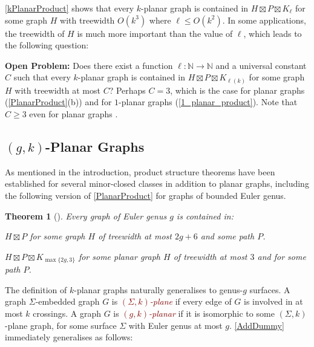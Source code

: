 \documentclass{patmorin}
\theoremstyle{plain}
\newtheorem{thm}{Theorem}
\theoremstyle{definition}
\newcommand{\defin}[1]{\textcolor{Maroon}{\emph{#1}}}
\renewcommand{\geq}{\geqslant}
\renewcommand{\leq}{\leqslant}
\newcommand{\N}{\mathbb{N}}
\begin{document}


\cref{kPlanarProduct} shows that every $k$-planar graph is contained in $H\boxtimes P \boxtimes K_\ell$ for some graph $H$ with treewidth $O(k^3)$ where $\ell\leq O(k^2)$.  In some applications, the treewidth of $H$ is much more important than the value of $\ell$, which leads to the following question:

\noindent\textbf{Open Problem:}
  Does there exist a function $\ell:\N\to\N$ and a universal constant $C$ such that every $k$-planar graph is contained in $H\boxtimes P \boxtimes K_{\ell(k)}$ for some graph $H$ with treewidth at most $C$?  Perhaps $C=3$, which is the case for planar graphs (\cref{PlanarProduct}(b)) and for $1$-planar graphs (\cref{1_planar_product}). Note that $C\geq 3$ even for planar graphs \citep{DJMMUW20}.

\subsection{\boldmath $(g,k)$-Planar Graphs}
\label{gk_planar_section}

As mentioned in the introduction, product structure theorems have been established for several minor-closed classes in addition to planar graphs, including the following version of \cref{PlanarProduct} for graphs of bounded Euler genus.

\begin{thm}[\citep{DJMMUW20,UWY,DHHW}]\label{GenusProduct}
  Every graph of Euler genus $g$ is contained in:
  \begin{compactenum}[(a)]
  \item $H  \boxtimes P$ for some graph $H$ of treewidth at most $2g+6$  and some path $P$.
  \item $H \boxtimes P \boxtimes K_{\max\{2g,3\}}$ for some planar graph $H$ of treewidth at most $3$ and for some path $P$.
  \end{compactenum}
\end{thm}

The definition of $k$-planar graphs naturally generalises to genus-$g$ surfaces. A graph $\Sigma$-embedded graph $G$ is \defin{$(\Sigma,k)$-plane} if every edge of $G$ is involved in at most $k$ crossings.  A graph $G$ is \defin{$(g,k)$-planar} if it is isomorphic to some $(\Sigma,k)$-plane graph, for some surface $\Sigma$ with Euler genus at most $g$. \cref{AddDummy} immediately generalises as follows:
\end{document}
